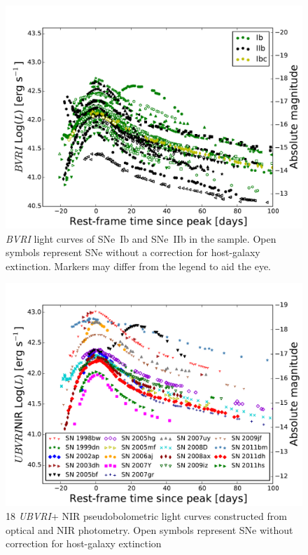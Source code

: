 \documentclass[a4paper,fleqn,usenatbib]{mnras}
\begin{document}
\begin{figure}
\centering
\includegraphics[scale=0.4]{BVRI_Ib_IIb_Bolometric_LCs.pdf}
\caption{\textit{BVRI} light curves of SNe~Ib and SNe~IIb in the sample. Open symbols represent SNe without a correction for host-galaxy extinction. Markers may differ from the legend to aid the eye.}
\label{fig:IbBVRILCs}
\end{figure}

\begin{figure}
\centering
\includegraphics[scale=0.4]{UBVRINIR_Bolometric_LCs.pdf}
\caption{18 \textit{UBVRI}+ NIR pseudobolometric light curves constructed from optical and NIR photometry. Open symbols represent SNe without correction for host-galaxy extinction}
\label{fig:ONIRLCs}
\end{figure}
 
\end{document}
